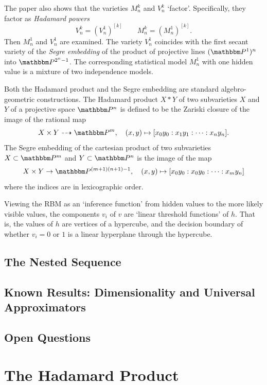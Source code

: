 \documentclass[11pt,titlepage]{article}
\numberwithin{equation}{section}
\begin{document}
    The paper \cite{CMS09} also shows that the varieties $M_n^k$ and $V_n^k$
    `factor'.  Specifically, they factor as \emph{Hadamard powers}
    \[
        V_n^k = (V_n^1)^{[k]}
        \qquad
        M_n^k = (M_n^1)^{[k]}.
    \]
    Then $M_n^1$ and $V_n^1$ are examined.  The variety $V_n^1$ coincides with
    the first secant variety of the \emph{Segre embedding} of the product of
    projective lines $(\Proj^1)^n$ into $\Proj^{2^n-1}$.  The corresponding
    statistical model $M_n^1$ with one hidden value is a mixture of two
    independence models.

    Both the Hadamard product and the Segre embedding are standard
    algebro-geometric constructions.  The Hadamard product $X * Y$ of two
    subvarieties $X$ and $Y$ of a projective space $\Proj^n$ is defined to be
    the Zariski closure of the image of the rational map
    \[
        X \times Y \dashrightarrow \Proj^m,
        \quad
        (x, y) \mapsto [x_0y_0: x_1y_1 : \cdots : x_n y_n].
    \]
    The Segre embedding of the cartesian product of two subvarieties $X \subset
    \Proj^m$ and $Y \subset \Proj^n$ is the image of the map
    \[
        X \times Y \to \Proj^{(m+1)(n+1) - 1},
        \quad
        (x, y) \mapsto
        [x_0y_0: x_0 y_0 : \cdots : x_my_n]
    \]
    where the indices are in lexicographic order.

    Viewing the RBM as an `inference function' from hidden values to the more
    likely visible values, the components $v_i$ of $v$ are
    `linear threshold functions' of $h$.  That is, the values of $h$ are
    vertices of a hypercube, and the decision boundary of whether $v_i = 0$ or
    $1$ is a linear hyperplane through the hypercube.

\subsection{The Nested Sequence}

\subsection{Known Results: Dimensionality and Universal Approximators}

\subsection{Open Questions}


\section{The Hadamard Product}
    
\end{document}
